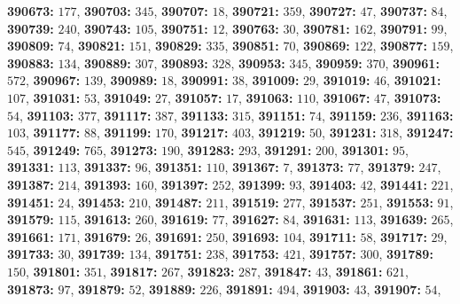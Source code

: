 \textsf{\bfseries 390673:} $177$, \textsf{\bfseries 390703:} $345$, \textsf{\bfseries 390707:} $18$, \textsf{\bfseries 390721:} $359$, \textsf{\bfseries 390727:} $47$, \textsf{\bfseries 390737:} $84$, \textsf{\bfseries 390739:} $240$, \textsf{\bfseries 390743:} $105$, \textsf{\bfseries 390751:} $12$, \textsf{\bfseries 390763:} $30$, \textsf{\bfseries 390781:} $162$, \textsf{\bfseries 390791:} $99$, \textsf{\bfseries 390809:} $74$, \textsf{\bfseries 390821:} $151$, \textsf{\bfseries 390829:} $335$, \textsf{\bfseries 390851:} $70$, \textsf{\bfseries 390869:} $122$, \textsf{\bfseries 390877:} $159$, \textsf{\bfseries 390883:} $134$, \textsf{\bfseries 390889:} $307$, \textsf{\bfseries 390893:} $328$, \textsf{\bfseries 390953:} $345$, \textsf{\bfseries 390959:} $370$, \textsf{\bfseries 390961:} $572$, \textsf{\bfseries 390967:} $139$, \textsf{\bfseries 390989:} $18$, \textsf{\bfseries 390991:} $38$, \textsf{\bfseries 391009:} $29$, \textsf{\bfseries 391019:} $46$, \textsf{\bfseries 391021:} $107$, \textsf{\bfseries 391031:} $53$, \textsf{\bfseries 391049:} $27$, \textsf{\bfseries 391057:} $17$, \textsf{\bfseries 391063:} $110$, \textsf{\bfseries 391067:} $47$, \textsf{\bfseries 391073:} $54$, \textsf{\bfseries 391103:} $377$, \textsf{\bfseries 391117:} $387$, \textsf{\bfseries 391133:} $315$, \textsf{\bfseries 391151:} $74$, \textsf{\bfseries 391159:} $236$, \textsf{\bfseries 391163:} $103$, \textsf{\bfseries 391177:} $88$, \textsf{\bfseries 391199:} $170$, \textsf{\bfseries 391217:} $403$, \textsf{\bfseries 391219:} $50$, \textsf{\bfseries 391231:} $318$, \textsf{\bfseries 391247:} $545$, \textsf{\bfseries 391249:} $765$, \textsf{\bfseries 391273:} $190$, \textsf{\bfseries 391283:} $293$, \textsf{\bfseries 391291:} $200$, \textsf{\bfseries 391301:} $95$, \textsf{\bfseries 391331:} $113$, \textsf{\bfseries 391337:} $96$, \textsf{\bfseries 391351:} $110$, \textsf{\bfseries 391367:} $7$, \textsf{\bfseries 391373:} $77$, \textsf{\bfseries 391379:} $247$, \textsf{\bfseries 391387:} $214$, \textsf{\bfseries 391393:} $160$, \textsf{\bfseries 391397:} $252$, \textsf{\bfseries 391399:} $93$, \textsf{\bfseries 391403:} $42$, \textsf{\bfseries 391441:} $221$, \textsf{\bfseries 391451:} $24$, \textsf{\bfseries 391453:} $210$, \textsf{\bfseries 391487:} $211$, \textsf{\bfseries 391519:} $277$, \textsf{\bfseries 391537:} $251$, \textsf{\bfseries 391553:} $91$, \textsf{\bfseries 391579:} $115$, \textsf{\bfseries 391613:} $260$, \textsf{\bfseries 391619:} $77$, \textsf{\bfseries 391627:} $84$, \textsf{\bfseries 391631:} $113$, \textsf{\bfseries 391639:} $265$, \textsf{\bfseries 391661:} $171$, \textsf{\bfseries 391679:} $26$, \textsf{\bfseries 391691:} $250$, \textsf{\bfseries 391693:} $104$, \textsf{\bfseries 391711:} $58$, \textsf{\bfseries 391717:} $29$, \textsf{\bfseries 391733:} $30$, \textsf{\bfseries 391739:} $134$, \textsf{\bfseries 391751:} $238$, \textsf{\bfseries 391753:} $421$, \textsf{\bfseries 391757:} $300$, \textsf{\bfseries 391789:} $150$, \textsf{\bfseries 391801:} $351$, \textsf{\bfseries 391817:} $267$, \textsf{\bfseries 391823:} $287$, \textsf{\bfseries 391847:} $43$, \textsf{\bfseries 391861:} $621$, \textsf{\bfseries 391873:} $97$, \textsf{\bfseries 391879:} $52$, \textsf{\bfseries 391889:} $226$, \textsf{\bfseries 391891:} $494$, \textsf{\bfseries 391903:} $43$, \textsf{\bfseries 391907:} $54$, 
